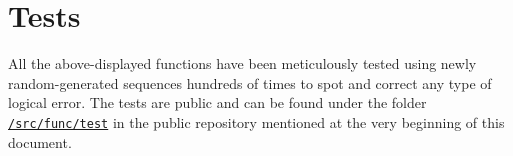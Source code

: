 \setcounter{secnumdepth}{0}
\vspace{40px} \section{Tests}
All the above-displayed functions have been meticulously tested using newly random-generated sequences hundreds of times to spot and correct any type of logical error. The tests are public and can be found under the folder \href{https://github.com/imAlessas/transmission-simulation/tree/main/src/func/test}{\texttt{/src/func/test}} in the public repository mentioned at the very beginning of this document.



\setcounter{secnumdepth}{1}